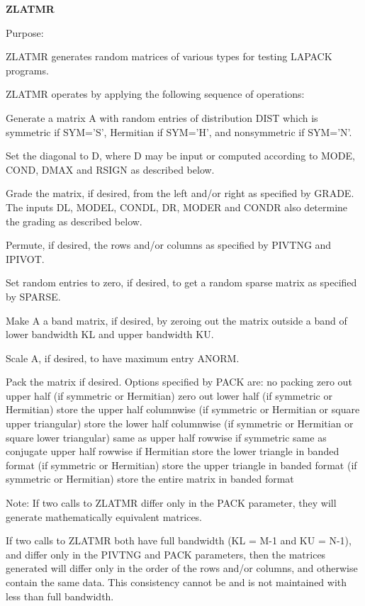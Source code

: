{\bfseries Z\+L\+A\+T\+M\+R} 

\begin{DoxyParagraph}{Purpose\+: }
\begin{DoxyVerb}    ZLATMR generates random matrices of various types for testing
    LAPACK programs.

    ZLATMR operates by applying the following sequence of
    operations:

      Generate a matrix A with random entries of distribution DIST
         which is symmetric if SYM='S', Hermitian if SYM='H', and
         nonsymmetric if SYM='N'.

      Set the diagonal to D, where D may be input or
         computed according to MODE, COND, DMAX and RSIGN
         as described below.

      Grade the matrix, if desired, from the left and/or right
         as specified by GRADE. The inputs DL, MODEL, CONDL, DR,
         MODER and CONDR also determine the grading as described
         below.

      Permute, if desired, the rows and/or columns as specified by
         PIVTNG and IPIVOT.

      Set random entries to zero, if desired, to get a random sparse
         matrix as specified by SPARSE.

      Make A a band matrix, if desired, by zeroing out the matrix
         outside a band of lower bandwidth KL and upper bandwidth KU.

      Scale A, if desired, to have maximum entry ANORM.

      Pack the matrix if desired. Options specified by PACK are:
         no packing
         zero out upper half (if symmetric or Hermitian)
         zero out lower half (if symmetric or Hermitian)
         store the upper half columnwise (if symmetric or Hermitian
             or square upper triangular)
         store the lower half columnwise (if symmetric or Hermitian
             or square lower triangular)
             same as upper half rowwise if symmetric
             same as conjugate upper half rowwise if Hermitian
         store the lower triangle in banded format
             (if symmetric or Hermitian)
         store the upper triangle in banded format
             (if symmetric or Hermitian)
         store the entire matrix in banded format

    Note: If two calls to ZLATMR differ only in the PACK parameter,
          they will generate mathematically equivalent matrices.

          If two calls to ZLATMR both have full bandwidth (KL = M-1
          and KU = N-1), and differ only in the PIVTNG and PACK
          parameters, then the matrices generated will differ only
          in the order of the rows and/or columns, and otherwise
          contain the same data. This consistency cannot be and
          is not maintained with less than full bandwidth.\end{DoxyVerb}
 
\end{DoxyParagraph}

